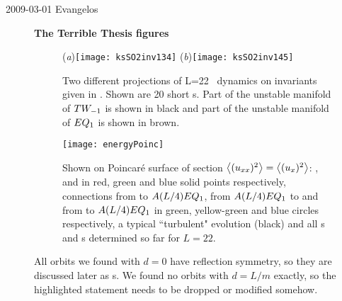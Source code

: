 \begin{description}

\item[2009-03-01 Evangelos] {\bf The Terrible Thesis figures}

\begin{figure}
\begin{center}
  (\textit{a})\texttt{[image: ksSO2inv134]}
  (\textit{b})\texttt{[image: ksSO2inv145]}
\end{center}
\caption[\KS\  reduced  state-space projection II]
{Two different projections of L=22 \KS\ dynamics on
invariants given in . Shown are 20
short \rpo s. Part of the unstable manifold of $TW_{-1}$
is shown in black and part of the unstable manifold of
$EQ_{1}$ is shown in brown.}
\label{fig:SO2inv}
\end{figure}


\begin{figure}
\begin{center}
    \texttt{[image: energyPoinc]}
\end{center}
\caption[Poincar\'{e} surface of section for L=22]
        {
Shown on Poincar\'{e} surface of section
$\left\langle {(u_{xx})^2} \right\rangle = \left\langle {(u_{x})^2} \right\rangle$:
,  and  in red, green and blue solid points respectively,
connections from  to $A(L/4)EQ_{1}$,
from $A(L/4)EQ_{1}$ to  and from  to $A(L/4)EQ_{1}$ in green,
yellow-green and blue circles respectively,
a typical ``turbulent" evolution (black) and all \po s and \rpo s
determined so far for $L=22$.
        }
\label{f:drivedragPoinc}
\end{figure}


{All orbits we found with $d = 0$ have reflection symmetry,
so they are discussed later as \po s.  We found no orbits with
$d = L/m$ exactly, so the highlighted statement needs to be dropped or
modified somehow.}


\end{description}
